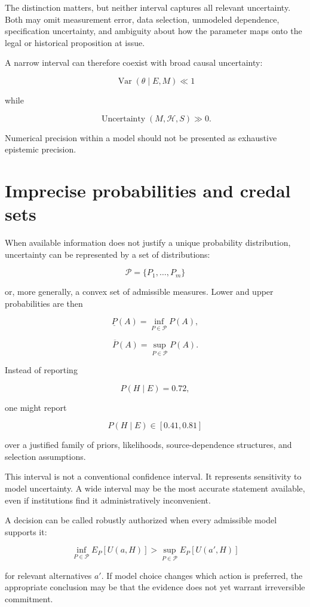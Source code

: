 The distinction matters, but neither interval captures all relevant uncertainty. Both may omit measurement error, data selection, unmodeled dependence, specification uncertainty, and ambiguity about how the parameter maps onto the legal or historical proposition at issue.

A narrow interval can therefore coexist with broad causal uncertainty:

\[
\operatorname{Var}(\theta\mid E,M)\ll1
\]

while

\[
\operatorname{Uncertainty}(M,\mathcal H,S)\gg0.
\]

Numerical precision within a model should not be presented as exhaustive epistemic precision.

\section{Imprecise probabilities and credal sets}
\label{sec:a22}

When available information does not justify a unique probability distribution, uncertainty can be represented by a set of distributions:

\[
\mathcal P=\{P_1,\ldots,P_m\}
\]

or, more generally, a convex set of admissible measures. Lower and upper probabilities are then

\[
\underline P(A)
=
\inf_{P\in\mathcal P}P(A),
\]

\[
\overline P(A)
=
\sup_{P\in\mathcal P}P(A).
\]

Instead of reporting

\[
P(H\mid E)=0.72,
\]

one might report

\[
P(H\mid E)\in[0.41,0.81]
\]

over a justified family of priors, likelihoods, source-dependence structures, and selection assumptions.

This interval is not a conventional confidence interval. It represents sensitivity to model uncertainty. A wide interval may be the most accurate statement available, even if institutions find it administratively inconvenient.

A decision can be called robustly authorized when every admissible model supports it:

\[
\inf_{P\in\mathcal P}
E_P[U(a,H)]
>
\sup_{P\in\mathcal P}
E_P[U(a',H)]
\]

for relevant alternatives \(a'\). If model choice changes which action is preferred, the appropriate conclusion may be that the evidence does not yet warrant irreversible commitment.

